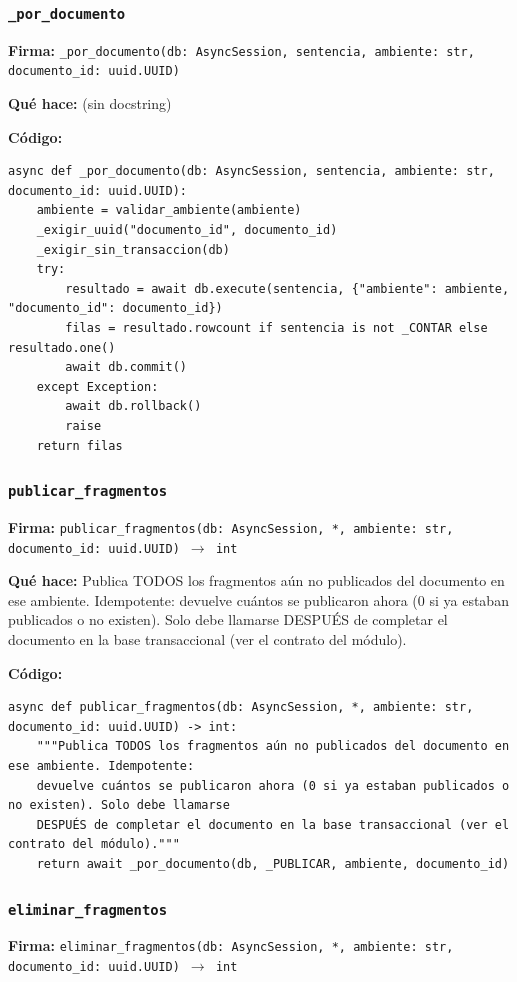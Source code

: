 \documentclass[11pt,a4paper]{article}
\begin{document}
\subsubsection*{\texttt{\_por\_documento}}
\textbf{Firma:} \texttt{\_por\_documento(db: AsyncSession, sentencia, ambiente: str, documento\_id: uuid.UUID)}

\textbf{Qué hace:} (sin docstring)

\textbf{Código:}
\begin{lstlisting}
async def _por_documento(db: AsyncSession, sentencia, ambiente: str, documento_id: uuid.UUID):
    ambiente = validar_ambiente(ambiente)
    _exigir_uuid("documento_id", documento_id)
    _exigir_sin_transaccion(db)
    try:
        resultado = await db.execute(sentencia, {"ambiente": ambiente, "documento_id": documento_id})
        filas = resultado.rowcount if sentencia is not _CONTAR else resultado.one()
        await db.commit()
    except Exception:
        await db.rollback()
        raise
    return filas
\end{lstlisting}

\subsubsection*{\texttt{publicar\_fragmentos}}
\textbf{Firma:} \texttt{publicar\_fragmentos(db: AsyncSession, *, ambiente: str, documento\_id: uuid.UUID) $\rightarrow$ int}

\textbf{Qué hace:} Publica TODOS los fragmentos aún no publicados del documento en ese ambiente. Idempotente:
devuelve cuántos se publicaron ahora (0 si ya estaban publicados o no existen). Solo debe llamarse
DESPUÉS de completar el documento en la base transaccional (ver el contrato del módulo).

\textbf{Código:}
\begin{lstlisting}
async def publicar_fragmentos(db: AsyncSession, *, ambiente: str, documento_id: uuid.UUID) -> int:
    """Publica TODOS los fragmentos aún no publicados del documento en ese ambiente. Idempotente:
    devuelve cuántos se publicaron ahora (0 si ya estaban publicados o no existen). Solo debe llamarse
    DESPUÉS de completar el documento en la base transaccional (ver el contrato del módulo)."""
    return await _por_documento(db, _PUBLICAR, ambiente, documento_id)
\end{lstlisting}

\subsubsection*{\texttt{eliminar\_fragmentos}}
\textbf{Firma:} \texttt{eliminar\_fragmentos(db: AsyncSession, *, ambiente: str, documento\_id: uuid.UUID) $\rightarrow$ int}
\end{document}
